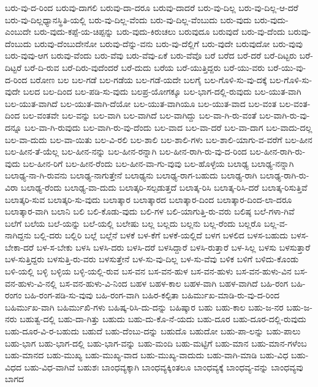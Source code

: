 {ಬರು-ವು-ದ-ರಿಂದ
ಬರುವು-ದಾಗಲಿ
ಬರುವು-ದಾ-ದರೂ
ಬರುವು-ದಾದರೆ
ಬರು-ವು-ದಿಲ್ಲ
ಬರು-ವು-ದಿಲ್ಲ-ಆ-ದರೆ
ಬರು-ವು-ದಿಲ್ಲಧ್ಯಾನಸ್ಥಿತಿ-ಯಲ್ಲಿ
ಬರು-ವು-ದಿಲ್ಲ-ವೆಂದು
ಬರು-ವು-ದಿಲ್ಲ-ವೆಂಬುದು
ಬರು-ವುದು
ಬರು-ವುದು-ಎಂಬುದೇ
ಬರು-ವುದು-ಕಪ್ಪೆ-ಯ-ಚಿಪ್ಪನ್ನು
ಬರು-ವುದು-ಕಿರುಚಲು
ಬರುವುದೂ
ಬರುವುದೆ
ಬರು-ವು-ದೆಂದು
ಬರುವು-ದೆಂಬುದು
ಬರುವು-ದೆಂಬುದೇನೋ
ಬರುವು-ದೆನ್ನು-ವನು
ಬರು-ವು-ದೆಲ್ಲಿಗೆ
ಬರು-ವುದೇ
ಬರುವುದೋ
ಬರು-ವುವು
ಬರು-ವುವು-ಆಗ
ಬರುವು-ವೆಂದು
ಬರು-ವೆವು
ಬರು-ವೆವು-ಏಕೆ
ಬರು-ವೆವೊ
ಬರೆ
ಬರೆದ
ಬರೆ-ದರೆ
ಬರೆ-ದಿಟ್ಟರು
ಬರೆ-ದಿಟ್ಟರೆ
ಬರೆ-ದಿ-ರುವ
ಬರೆ-ದಿರು-ವುದೆಂದರೆ
ಬರೆ-ದುದು
ಬರೆಯ
ಬರೆ-ಯುತ್ತಿದ್ದರು
ಬರೆ-ಯು-ವರು
ಬರೆ-ಯು-ವು-ದ-ರಿಂದ
ಬರೋಣ
ಬಲ
ಬಲ-ಗಡೆ
ಬಲ-ಗಡೆಯ
ಬಲ-ಗಡೆ-ಯದೇ
ಬಲಗೈ
ಬಲ-ಗೊಳಿ-ಸು-ವು-ದಕ್ಕೆ
ಬಲ-ಗೊಳಿ-ಸು-ವುದೇ
ಬಲದ
ಬಲ-ದಿಂದ
ಬಲ-ಪಡಿ-ಸು-ವುದು
ಬಲಪ್ರ-ಯೋಗಕ್ಕೂ
ಬಲ-ಭಾಗ-ದಲ್ಲಿ-ರುವುದು
ಬಲ-ಯುತ-ವಾಗಿ
ಬಲ-ಯುತ-ವಾಗಿದೆ
ಬಲ-ಯುತ-ವಾಗಿ-ದೆಯೋ
ಬಲ-ಯುತ-ವಾಗಿಯೂ
ಬಲ-ಯುತ-ವಾದ
ಬಲ-ವಂತ
ಬಲ-ವಂತ-ದಿಂದ
ಬಲ-ವಂತವೇ
ಬಲ-ವನ್ನು
ಬಲ-ವಾಗಿ
ಬಲ-ವಾಗಿದೆ
ಬಲ-ವಾಗಿದ್ದು
ಬಲ-ವಾ-ಗಿ-ರು-ವಂತೆ
ಬಲ-ವಾಗಿ-ರು-ವು-ದನ್ನೂ
ಬಲ-ವಾ-ಗಿ-ರುವುದು
ಬಲ-ವಾಗಿ-ರು-ವು-ದೆಂದು
ಬಲ-ವಾದ
ಬಲ-ವಾ-ದರೆ
ಬಲ-ವಾ-ದಾಗ
ಬಲ-ವಾದು-ದಲ್ಲ
ಬಲ-ವಾ-ದುದು
ಬಲ-ವಾ-ಯಿತು
ಬಲ-ವಿ-ರಲಿ
ಬಲ-ಶಾಲಿ
ಬಲ-ಶಾಲಿ-ಗಳು
ಬಲ-ಶಾಲಿ-ಯಾಗು-ವ-ವರೆಗೆ
ಬಲ-ಹೀನ
ಬಲ-ಹೀನ-ತೆ-ಯೆಲ್ಲ
ಬಲ-ಹೀನ-ನನ್ನು
ಬಲ-ಹೀನ-ರನ್ನಾಗಿ
ಬಲ-ಹೀನ-ರಾಗಿ-ರು-ವು-ದ-ರಿಂದ
ಬಲ-ಹೀನ-ರಾಗಿ-ರು-ವುದು
ಬಲ-ಹೀನ-ರಿಗೆ
ಬಲ-ಹೀನ-ರೆಂದು
ಬಲ-ಹೀನ-ವಾ-ಗು-ವುವು
ಬಲ-ಹೊಳ್ಳೆಯ
ಬಲಾಢ್ಯ
ಬಲಾಢ್ಯ-ನನ್ನಾಗಿ
ಬಲಾಢ್ಯ-ನಾ-ಗಿ-ರುವನು
ಬಲಾಢ್ಯ-ನಾಗುತ್ತೇನೆ
ಬಲಾಢ್ಯನು
ಬಲಾಢ್ಯ-ರಾಗ-ಬಹುದು
ಬಲಾಢ್ಯ-ರಾಗಿ
ಬಲಾಢ್ಯ-ರಾಗಿ-ರು-ವಿರಾ
ಬಲಾಢ್ಯ-ರೆಂದು
ಬಲಾಢ್ಯ-ವಾ-ದುದು
ಬಲಾತ್ಕರಿ-ಸಲ್ಪಡುತ್ತದೆ
ಬಲಾತ್ಕ-ರಿಸಿ
ಬಲಾತ್ಕ-ರಿಸಿ-ದರೆ
ಬಲಾತ್ಕ-ರಿಸುತ್ತಿವೆ
ಬಲಾತ್ಕರಿ-ಸುವ
ಬಲಾತ್ಕರಿ-ಸು-ವುದು
ಬಲಾತ್ಕಾರ
ಬಲಾತ್ಕಾರದ
ಬಲಾತ್ಕಾರ-ದಿಂದ
ಬಲಾತ್ಕಾರ-ದಿಂದ-ಲಾ-ದರೂ
ಬಲಾತ್ಕಾರ-ವಾಗಿ
ಬಲಾನಿ
ಬಲಿ
ಬಲಿ-ಕೊಡು-ವುದು
ಬಲಿ-ಗಳ
ಬಲಿ-ಯಾಗುತ್ತಿ-ರು-ವರು
ಬಲಿಷ್ಠ
ಬಲೆ-ಗಳಾ-ಗಿವೆ
ಬಲೆಗೆ
ಬಲೆಯ
ಬಲೆ-ಯನ್ನು
ಬಲೆ-ಯಲ್ಲಿ
ಬಲೇಷು
ಬಲ್ಲ
ಬಲ್ಲದು
ಬಲ್ಲನು
ಬಲ್ಲ-ರೆಂದು
ಬಲ್ಲರೊ
ಬಲ್ಲ-ವ-ನಾಗಿದ್ದನು
ಬಲ್ಲಿ-ದರು
ಬಲ್ಲಿರಿ
ಬಲ್ಲೆ
ಬಲ್ಲೆನೆ
ಬಳಕೆ
ಬಳ-ಕೆಗೆ
ಬಳಕೆ-ಯಲ್ಲಿದೆ
ಬಳಗ
ಬಳಲಿದ
ಬಳಸ-ಬಹುದು
ಬಳಸ-ಬೇಕಾ-ದರೆ
ಬಳ-ಸ-ಬೇಕು
ಬಳಸಿ
ಬಳಸಿ-ದರು
ಬಳಸಿ-ದರೆ
ಬಳಸಿದ್ದಾರೆ
ಬಳಸಿ-ರುತ್ತಾರೆ
ಬಳ-ಸಿಲ್ಲ
ಬಳಸು
ಬಳಸುತ್ತಾರೆ
ಬಳ-ಸುತ್ತಿದ್ದರು
ಬಳಸುತ್ತಿ-ರು-ವರು
ಬಳಸುತ್ತೇನೆ
ಬಳ-ಸು-ವು-ದಿಲ್ಲ
ಬಳ-ಸು-ವೆವು
ಬಳಿಕ
ಬಳಿಗೆ
ಬಳಿದು-ಕೊಂಡು
ಬಳಿ-ಯಲ್ಲಿ
ಬಳ್ಳಿ
ಬಳ್ಳಿಯ
ಬಳ್ಳಿ-ಯಲ್ಲಿ-ರುವ
ಬಸ-ವನ
ಬಸ-ವನ-ಹುಳ
ಬಸ-ವನ-ಹುಳು
ಬಸ-ವನ-ಹುಳು-ವಿನ
ಬಸ-ವನ-ಹುಳು-ವಿ-ನಲ್ಲಿ
ಬಸ-ವನ-ಹುಳು-ವಿ-ನಿಂದ
ಬಹಳ
ಬಹಳ-ಕಾಲ
ಬಹಳ-ವಾಗಿ
ಬಹಳ-ವಾಗಿದೆ
ಬಹಿ-ರಂಗ
ಬಹಿ-ರಂಗಂ
ಬಹಿ-ರಂಗ-ಪಡಿ-ಸು-ವುವು
ಬಹಿ-ರಂಗ-ವಾಗಿ
ಬಹಿರ-ಕಲ್ಪಿತಾ
ಬಹಿರ್ಮುಖ-ಮಾಡಿ-ರು-ವು-ದ-ರಿಂದ
ಬಹಿರ್ಮುಖ-ವಾಗಿ
ಬಹಿರ್ಮುಖಿ-ಗಳು
ಬಹಿಷ್ಕ-ರಿಸಿ-ದು-ದನ್ನು
ಬಹಿಷ್ಕಾರ
ಬಹು
ಬಹು-ಕಾಲ
ಬಹು-ಜ-ನರ
ಬಹು-ಜ-ನರು
ಬಹುತ್ವ-ದಲ್ಲಿ
ಬಹು-ದಾ-ಗಿತ್ತು
ಬಹುದು
ಬಹು-ದು-ಕೊ-ನೆ-ಯದು
ಬಹು-ದೂರ
ಬಹು-ದೂರ-ದಲ್ಲಿ-ರುವುದು
ಬಹು-ದೂರ-ವಿ-ರ-ಬಹುದು
ಬಹುದೆ
ಬಹು-ದೆಂಬು-ದನ್ನು
ಬಹುದೊ
ಬಹುದೋ
ಬಹು-ಪಾ-ಲನ್ನು
ಬಹು-ಪಾಲು
ಬಹು-ಭಾಗ
ಬಹು-ಭಾಗ-ದಲ್ಲಿ
ಬಹು-ಭಾಗ-ವನ್ನು
ಬಹು-ಮಂದಿ
ಬಹು-ಮಟ್ಟಿಗೆ
ಬಹು-ಮಾನ
ಬಹು-ಮಾನ-ಗಳೆಂಬ
ಬಹು-ಮಾನದ
ಬಹು-ಮುಖ್ಯ
ಬಹು-ಮುಖ್ಯ-ವಾದ
ಬಹು-ಮುಖ್ಯ-ವಾದುದು
ಬಹು-ವಾಗಿ-ಮಾಡಿ
ಬಹು-ವಿಧ
ಬಹು-ವಿಧದ
ಬಹು-ವಿಧ-ವಾಗಿವೆ
ಬಹುಶಃ
ಬಾಂಧವ್ಯಕ್ಕಾಗಿ
ಬಾಂಧವ್ಯಕ್ಕಿಂತಲೂ
ಬಾಂಧವ್ಯಕ್ಕೆ
ಬಾಂಧವ್ಯ-ವನ್ನು
ಬಾಂಧವ್ಯವು
ಬಾಗದ
}
